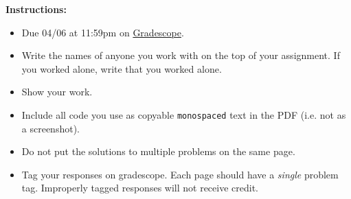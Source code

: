 \documentclass[12pt]{article}
\theoremstyle{definition}
\begin{document}
    \textbf{\Large{}}
    
    \vspace{-1.8em}
    \hrulefill
 
\textbf{Instructions:}
    \begin{itemize}
        \item Due 04/06 at 11:59pm on \href{https://www.gradescope.com/courses/487363/}{Gradescope}.
        \item Write the names of anyone you work with on the top of your assignment. If you worked alone, write that you worked alone.
        \item Show your work.
        \item Include all code you use as copyable \verb|monospaced| text in the PDF (i.e. not as a screenshot).
        \item Do not put the solutions to multiple problems on the same page.
        \item Tag your responses on gradescope. Each page should have a \emph{single} problem tag. Improperly tagged responses will not receive credit.
\end{itemize}
    
\vspace{2em}
\end{document}
